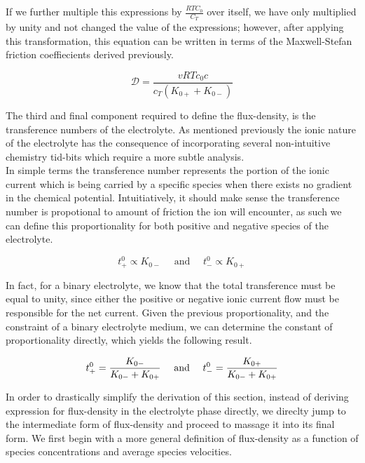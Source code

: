 \documentclass[lettersize,journal]{IEEEtran}
\begin{document}
If we further multiple this expressions by $\frac{RTC_0}{C_T}$ over itself, we have only multiplied by unity and not changed the value of the expressions; however, after applying this transformation, this equation can be written in terms of the Maxwell-Stefan friction coeffiecients derived previously.

\begin{equation}
\mathscr{D}=\frac{v R T c_{0} c}{c_{T}\left(K_{0+}+K_{0-}\right)}
\end{equation}

The third and final component required to define the flux-density, is the transference numbers of the electrolyte. As mentioned previously the ionic nature of the electrolyte has the consequence of incorporating several non-intuitive chemistry tid-bits which require a more subtle analysis. \\

In simple terms the transference number represents the portion of the ionic current which is being carried by a specific species when there exists no gradient in the chemical potential. Intuitiatively, it should make sense the transference number is propotional to amount of friction the ion will encounter, as such we can define this proportionality for both positive and negative species of the electrolyte.


\begin{equation}
t_{+}^{0} \propto K_{0-} \quad \text { and } \quad t_{-}^{0} \propto K_{0+}
\end{equation}

In fact, for a binary electrolyte, we know that the total transference must be equal to unity, since either the positive or negative ionic current flow must be responsible for the net current. Given the previous proportionality, and the constraint of a binary electrolyte medium, we can determine the constant of proportionality directly, which yields the following result.

\begin{equation}\label{transference_num_def}
t_{+}^{0}=\frac{K_{0-}}{K_{0-}+K_{0+}} \quad \text { and } \quad t_{-}^{0}=\frac{K_{0+}}{K_{0-}+K_{0+}} \\
\end{equation}

In order to drastically simplify the derivation of this section, instead of deriving expression for flux-density in the electrolyte phase directly, we direclty jump to the intermediate form of flux-density and proceed to massage it into its final form. We first begin with a more general definition of flux-density as a function of species concentrations and average species velocities.
\end{document}
